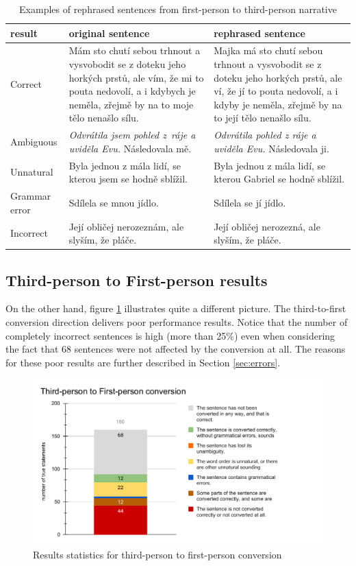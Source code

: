 \begin{table}[!ht]
	\caption{Examples of rephrased sentences from first-person to third-person narrative}
	\label{tab:example-first}
		\begin{tabular}{m{5em}|m{11em}|m{11em}}
			result & original sentence & rephrased sentence \\
			\hline
			Correct & Mám sto chutí sebou trhnout a vysvobodit se z doteku jeho horkých prstů, ale vím, že mi to pouta nedovolí, a i kdybych je neměla, zřejmě by na to moje tělo nenašlo sílu. &  Majka má sto chutí sebou trhnout a vysvobodit se z doteku jeho horkých prstů, ale ví, že jí to pouta nedovolí, a i kdyby je neměla, zřejmě by na to její tělo nenašlo sílu. \\
			Ambiguous & \emph{Odvrátila jsem pohled z~ráje a uviděla Evu.} Následovala mě. & \emph{Odvrátila pohled z ráje a uviděla Evu.} Následovala ji. \\
			Unnatural & Byla jednou z mála lidí, se kterou jsem se hodně sblížil. & Byla jednou z mála lidí, se kterou Gabriel se hodně sblížil. \\
			Grammar error & Sdílela se mnou jídlo. & Sdílela se jí jídlo. \\
			Incorrect & Její obličej nerozeznám, ale slyším, že pláče. & Její obličej nerozezná, ale slyším, že pláče. \\
		\end{tabular}
\end{table}


\subsection{Third-person to First-person results}
On the other hand, figure \ref{fig:eval-third-to-first} illustrates quite a different picture. The third-to-first conversion direction delivers poor performance results. Notice that the number of completely incorrect sentences is high (more than 25\%) even when considering the fact that 68 sentences were not affected by the conversion at all.
The reasons for these poor results are further described in Section \ref{sec:errors}.

\begin{figure}[!ht]
\includegraphics[width=\textwidth]{data/Eval-Third-To-First.pdf}
\caption{Results statistics for third-person to first-person conversion}
\label{fig:eval-third-to-first}
\end{figure}

